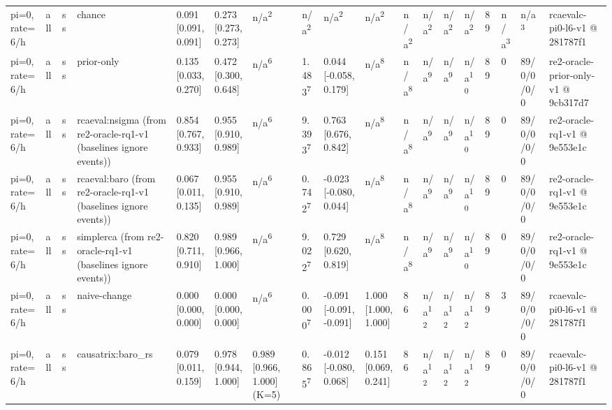 \begin{table}[t]
\begin{tabular}{llllllllllllllllll}
pi=0, rate=6/h & all & ss & chance & 0.091 [0.091, 0.091] & 0.273 [0.273, 0.273] & n/a\textsuperscript{2} & n/a\textsuperscript{2} & n/a\textsuperscript{2} & n/a\textsuperscript{2} & n/a\textsuperscript{2} & n/a\textsuperscript{2} & n/a\textsuperscript{2} & n/a\textsuperscript{2} & 89 & n/a\textsuperscript{3} & n/a\textsuperscript{3} & rcaevalc-pi0-l6-v1 @ 281787f1 \\
pi=0, rate=6/h & all & ss & prior-only & 0.135 [0.033, 0.270] & 0.472 [0.300, 0.648] & n/a\textsuperscript{6} & 1.483\textsuperscript{7} & 0.044 [-0.058, 0.179] & n/a\textsuperscript{8} & n/a\textsuperscript{8} & n/a\textsuperscript{9} & n/a\textsuperscript{9} & n/a\textsuperscript{10} & 89 & 0 & 89/0/0/0/0 & re2-oracle-prior-only-v1 @ 9cb317d7 \\
pi=0, rate=6/h & all & ss & rcaeval:nsigma (from re2-oracle-rq1-v1 (baselines ignore events)) & 0.854 [0.767, 0.933] & 0.955 [0.910, 0.989] & n/a\textsuperscript{6} & 9.393\textsuperscript{7} & 0.763 [0.676, 0.842] & n/a\textsuperscript{8} & n/a\textsuperscript{8} & n/a\textsuperscript{9} & n/a\textsuperscript{9} & n/a\textsuperscript{10} & 89 & 0 & 89/0/0/0/0 & re2-oracle-rq1-v1 @ 9e553e1c \\
pi=0, rate=6/h & all & ss & rcaeval:baro (from re2-oracle-rq1-v1 (baselines ignore events)) & 0.067 [0.011, 0.135] & 0.955 [0.910, 0.989] & n/a\textsuperscript{6} & 0.742\textsuperscript{7} & -0.023 [-0.080, 0.044] & n/a\textsuperscript{8} & n/a\textsuperscript{8} & n/a\textsuperscript{9} & n/a\textsuperscript{9} & n/a\textsuperscript{10} & 89 & 0 & 89/0/0/0/0 & re2-oracle-rq1-v1 @ 9e553e1c \\
pi=0, rate=6/h & all & ss & simplerca (from re2-oracle-rq1-v1 (baselines ignore events)) & 0.820 [0.711, 0.910] & 0.989 [0.966, 1.000] & n/a\textsuperscript{6} & 9.022\textsuperscript{7} & 0.729 [0.620, 0.819] & n/a\textsuperscript{8} & n/a\textsuperscript{8} & n/a\textsuperscript{9} & n/a\textsuperscript{9} & n/a\textsuperscript{10} & 89 & 0 & 89/0/0/0/0 & re2-oracle-rq1-v1 @ 9e553e1c \\
pi=0, rate=6/h & all & ss & naive-change & 0.000 [0.000, 0.000] & 0.000 [0.000, 0.000] & n/a\textsuperscript{6} & 0.000\textsuperscript{7} & -0.091 [-0.091, -0.091] & 1.000 [1.000, 1.000] & 86 & n/a\textsuperscript{12} & n/a\textsuperscript{12} & n/a\textsuperscript{12} & 89 & 3 & 89/0/0/0/0 & rcaevalc-pi0-l6-v1 @ 281787f1 \\
pi=0, rate=6/h & all & ss & causatrix:baro\_rs & 0.079 [0.011, 0.159] & 0.978 [0.944, 1.000] & 0.989 [0.966, 1.000] (K=5) & 0.865\textsuperscript{7} & -0.012 [-0.080, 0.068] & 0.151 [0.069, 0.241] & 86 & n/a\textsuperscript{12} & n/a\textsuperscript{12} & n/a\textsuperscript{12} & 89 & 0 & 89/0/0/0/0 & rcaevalc-pi0-l6-v1 @ 281787f1 \\

\end{tabular}
\end{table}
